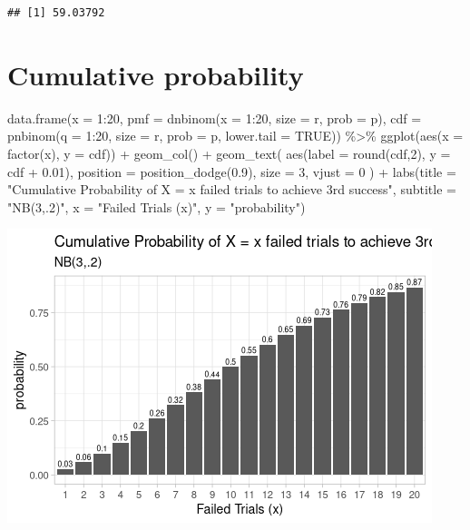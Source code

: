 \documentclass[
  10pt,
]{article}
\newenvironment{Shaded}{\begin{snugshade}}{\end{snugshade}}
\newcommand{\AttributeTok}[1]{\textcolor[rgb]{0.77,0.63,0.00}{#1}}
\newcommand{\ConstantTok}[1]{\textcolor[rgb]{0.00,0.00,0.00}{#1}}
\newcommand{\DecValTok}[1]{\textcolor[rgb]{0.00,0.00,0.81}{#1}}
\newcommand{\FloatTok}[1]{\textcolor[rgb]{0.00,0.00,0.81}{#1}}
\newcommand{\FunctionTok}[1]{\textcolor[rgb]{0.00,0.00,0.00}{#1}}
\newcommand{\NormalTok}[1]{#1}
\newcommand{\SpecialCharTok}[1]{\textcolor[rgb]{0.00,0.00,0.00}{#1}}
\newcommand{\StringTok}[1]{\textcolor[rgb]{0.31,0.60,0.02}{#1}}
\begin{document}
\begin{verbatim}
## [1] 59.03792
\end{verbatim}

\hypertarget{cumulative-probability}{%
\section{Cumulative probability}\label{cumulative-probability}}

\begin{Shaded}
\begin{Highlighting}[]
\FunctionTok{data.frame}\NormalTok{(}\AttributeTok{x =} \DecValTok{1}\SpecialCharTok{:}\DecValTok{20}\NormalTok{, }
           \AttributeTok{pmf =} \FunctionTok{dnbinom}\NormalTok{(}\AttributeTok{x =} \DecValTok{1}\SpecialCharTok{:}\DecValTok{20}\NormalTok{, }\AttributeTok{size =}\NormalTok{ r, }\AttributeTok{prob =}\NormalTok{ p),}
           \AttributeTok{cdf =} \FunctionTok{pnbinom}\NormalTok{(}\AttributeTok{q =} \DecValTok{1}\SpecialCharTok{:}\DecValTok{20}\NormalTok{, }\AttributeTok{size =}\NormalTok{ r, }\AttributeTok{prob =}\NormalTok{ p, }\AttributeTok{lower.tail =} \ConstantTok{TRUE}\NormalTok{)) }\SpecialCharTok{\%\textgreater{}\%}
\FunctionTok{ggplot}\NormalTok{(}\FunctionTok{aes}\NormalTok{(}\AttributeTok{x =} \FunctionTok{factor}\NormalTok{(x), }\AttributeTok{y =}\NormalTok{ cdf)) }\SpecialCharTok{+}
  \FunctionTok{geom\_col}\NormalTok{() }\SpecialCharTok{+}
  \FunctionTok{geom\_text}\NormalTok{(}
    \FunctionTok{aes}\NormalTok{(}\AttributeTok{label =} \FunctionTok{round}\NormalTok{(cdf,}\DecValTok{2}\NormalTok{), }\AttributeTok{y =}\NormalTok{ cdf }\SpecialCharTok{+} \FloatTok{0.01}\NormalTok{),}
    \AttributeTok{position =} \FunctionTok{position\_dodge}\NormalTok{(}\FloatTok{0.9}\NormalTok{),}
    \AttributeTok{size =} \DecValTok{3}\NormalTok{,}
    \AttributeTok{vjust =} \DecValTok{0}
\NormalTok{  ) }\SpecialCharTok{+}
  \FunctionTok{labs}\NormalTok{(}\AttributeTok{title =} \StringTok{"Cumulative Probability of X = x failed trials to achieve 3rd success"}\NormalTok{,}
       \AttributeTok{subtitle =} \StringTok{"NB(3,.2)"}\NormalTok{,}
       \AttributeTok{x =} \StringTok{"Failed Trials (x)"}\NormalTok{,}
       \AttributeTok{y =} \StringTok{"probability"}\NormalTok{) }
\end{Highlighting}
\end{Shaded}

\includegraphics{06.negative_binomial_files/figure-latex/unnamed-chunk-7-1.png}
\end{document}
